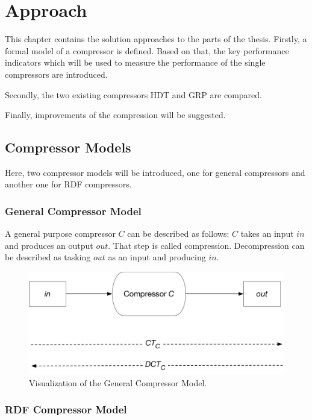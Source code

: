 \chapter{Approach}\label{ch:approach}

This chapter contains the solution approaches to the parts of the thesis. Firstly, a formal model of a compressor is defined. Based on that, the key performance indicators which will be used to measure the performance of the single compressors are introduced.

Secondly, the two existing compressors HDT and GRP are compared.

Finally, improvements of the compression will be suggested.


\section{Compressor Models}

Here, two compressor models will be introduced, one for general compressors and another one for RDF compressors. 

\subsection{General Compressor Model}\label{sec:generalcompressorModel}

A general purpose compressor $C$ can be described as follows: $C$ takes an input $in$ and produces an output $out$. That step is called compression. Decompression can be described as tasking $out$ as an input and producing $in$.

\begin{figure}
	\centering
	\includegraphics[width=0.8\linewidth]{figures/approach/model_general}
	\caption{Visualization of the General Compressor Model.}
	\label{fig:generalcompressorModel}
\end{figure}

\subsection{RDF Compressor Model}\label{sec:compressorModel}

